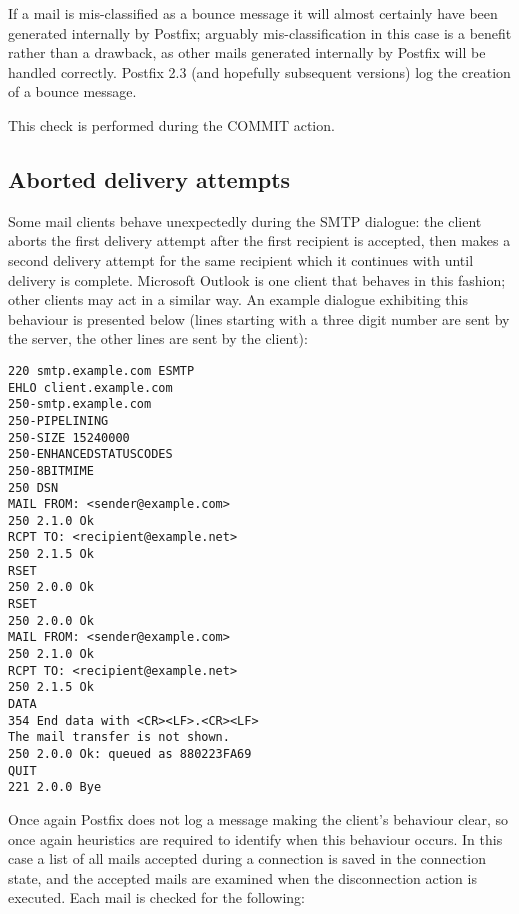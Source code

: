 If a mail is mis-classified as a bounce message it will almost certainly
have been generated internally by Postfix; arguably mis-classification in
this case is a benefit rather than a drawback, as other mails generated
internally by Postfix will be handled correctly.  Postfix 2.3 (and
hopefully subsequent versions) log the creation of a bounce message.

This check is performed during the COMMIT action.

\subsection{Aborted delivery attempts}

\label{aborted-delivery-attempts}

Some mail clients behave unexpectedly during the \gls{SMTP} dialogue: the
client aborts the first delivery attempt after the first recipient is
accepted, then makes a second delivery attempt for the same recipient which
it continues with until delivery is complete.  Microsoft Outlook is one
client that behaves in this fashion; other clients may act in a similar
way.  An example dialogue exhibiting this behaviour is presented below
(lines starting with a three digit number are sent by the server, the other
lines are sent by the client):

\begin{verbatim}
220 smtp.example.com ESMTP
EHLO client.example.com
250-smtp.example.com
250-PIPELINING
250-SIZE 15240000
250-ENHANCEDSTATUSCODES
250-8BITMIME
250 DSN
MAIL FROM: <sender@example.com>
250 2.1.0 Ok
RCPT TO: <recipient@example.net>
250 2.1.5 Ok
RSET
250 2.0.0 Ok
RSET
250 2.0.0 Ok
MAIL FROM: <sender@example.com>
250 2.1.0 Ok
RCPT TO: <recipient@example.net>
250 2.1.5 Ok
DATA
354 End data with <CR><LF>.<CR><LF>
The mail transfer is not shown.
250 2.0.0 Ok: queued as 880223FA69
QUIT
221 2.0.0 Bye
\end{verbatim}

Once again Postfix does not log a message making the client's behaviour
clear, so once again heuristics are required to identify when this
behaviour occurs.  In this case a list of all mails accepted during a
connection is saved in the connection state, and the accepted mails are
examined when the disconnection action is executed.  Each mail is checked
for the following: 

